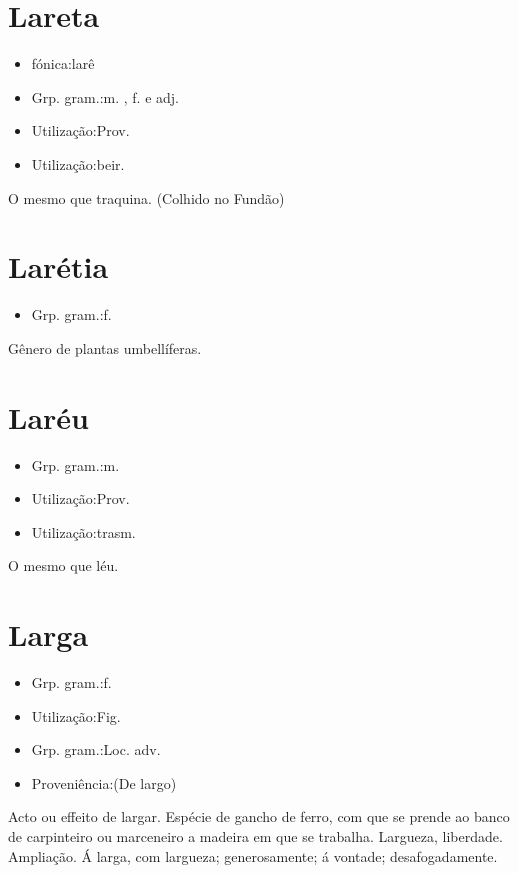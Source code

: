 \section{Lareta}
\begin{itemize}
\item {fónica:larê}
\end{itemize}
\begin{itemize}
\item {Grp. gram.:m. ,  f.  e  adj.}
\end{itemize}
\begin{itemize}
\item {Utilização:Prov.}
\end{itemize}
\begin{itemize}
\item {Utilização:beir.}
\end{itemize}
O mesmo que \textunderscore traquina\textunderscore . (Colhido no Fundão)
\section{Larétia}
\begin{itemize}
\item {Grp. gram.:f.}
\end{itemize}
Gênero de plantas umbellíferas.
\section{Laréu}
\begin{itemize}
\item {Grp. gram.:m.}
\end{itemize}
\begin{itemize}
\item {Utilização:Prov.}
\end{itemize}
\begin{itemize}
\item {Utilização:trasm.}
\end{itemize}
O mesmo que \textunderscore léu\textunderscore .
\section{Larga}
\begin{itemize}
\item {Grp. gram.:f.}
\end{itemize}
\begin{itemize}
\item {Utilização:Fig.}
\end{itemize}
\begin{itemize}
\item {Grp. gram.:Loc. adv.}
\end{itemize}
\begin{itemize}
\item {Proveniência:(De \textunderscore largo\textunderscore )}
\end{itemize}
Acto ou effeito de largar.
Espécie de gancho de ferro, com que se prende ao banco de carpinteiro ou marceneiro a madeira em que se trabalha.
Largueza, liberdade.
Ampliação.
\textunderscore Á larga\textunderscore , com largueza; generosamente; á vontade; desafogadamente.
